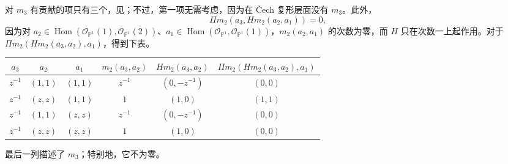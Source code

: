 \begin{example}
对 $m_3$ 有贡献的项只有三个，见；不过，第一项无需考虑，因为在 Čech 复形层面没有 $m_3$。此外，
\[
\Pi m_2(a_3,Hm_2(a_2,a_1))=0,
\]
因为对 $a_2\in\operatorname{Hom}(\mathcal O_{\mathbb P^1}(1),\mathcal O_{\mathbb P^1}(2))$、$a_1\in\operatorname{Hom}(\mathcal O_{\mathbb P^1},\mathcal O_{\mathbb P^1}(1))$，$m_2(a_2,a_1)$ 的次数为零，而 $H$ 只在次数一上起作用。对于 $\Pi m_2(Hm_2(a_3,a_2),a_1)$，得到下表。
\begin{table}[H]
\centering
\begingroup\footnotesize\setlength{\tabcolsep}{3pt}
\begin{tabular}{cccccc}
\toprule
$a_3$ & $a_2$ & $a_1$ & $m_2(a_3,a_2)$
& $Hm_2(a_3,a_2)$ & $\Pi m_2(Hm_2(a_3,a_2),a_1)$\\
\midrule
$z^{-1}$ & $(1,1)$ & $(1,1)$ & $z^{-1}$ & $(0,-z^{-1})$ & $(0,0)$\\
$z^{-1}$ & $(z,z)$ & $(1,1)$ & $1$ & $(1,0)$ & $(1,1)$\\
$z^{-1}$ & $(1,1)$ & $(z,z)$ & $z^{-1}$ & $(0,-z^{-1})$ & $(0,0)$\\
$z^{-1}$ & $(z,z)$ & $(z,z)$ & $1$ & $(1,0)$ & $(0,0)$\\
\bottomrule
\end{tabular}
\endgroup
\end{table}

最后一列描述了 $m_3$；特别地，它不为零。

\begin{figure}[H]
\centering
{}
\BookNumberOnlyCaption\label{fig:8.15}
\end{figure}
\end{example}
